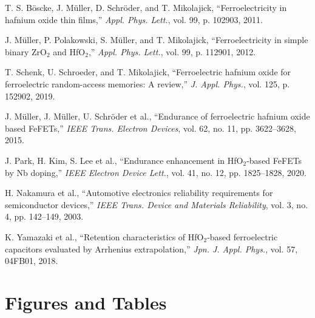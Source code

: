 \documentclass[conference]{IEEEtran}
\begin{document}
\begin{thebibliography}{8}
T. S. Böscke, J. Müller, D. Schröder, and T. Mikolajick, ``Ferroelectricity in hafnium oxide thin films,'' \emph{Appl. Phys. Lett.}, vol. 99, p. 102903, 2011.

J. Müller, P. Polakowski, S. Müller, and T. Mikolajick, ``Ferroelectricity in simple binary ZrO$_2$ and HfO$_2$,'' \emph{Appl. Phys. Lett.}, vol. 99, p. 112901, 2012.

T. Schenk, U. Schroeder, and T. Mikolajick, ``Ferroelectric hafnium oxide for ferroelectric random-access memories: A review,'' \emph{J. Appl. Phys.}, vol. 125, p. 152902, 2019.

J. Müller, J. Müller, U. Schröder et al., ``Endurance of ferroelectric hafnium oxide based FeFETs,'' \emph{IEEE Trans. Electron Devices}, vol. 62, no. 11, pp. 3622--3628, 2015.

J. Park, H. Kim, S. Lee et al., ``Endurance enhancement in HfO$_2$-based FeFETs by Nb doping,'' \emph{IEEE Electron Device Lett.}, vol. 41, no. 12, pp. 1825--1828, 2020.

H. Nakamura et al., ``Automotive electronics reliability requirements for semiconductor devices,'' \emph{IEEE Trans. Device and Materials Reliability}, vol. 3, no. 4, pp. 142--149, 2003.

K. Yamazaki et al., ``Retention characteristics of HfO$_2$-based ferroelectric capacitors evaluated by Arrhenius extrapolation,'' \emph{Jpn. J. Appl. Phys.}, vol. 57, 04FB01, 2018.
\end{thebibliography}

\clearpage
\section*{Figures and Tables}
\end{document}
